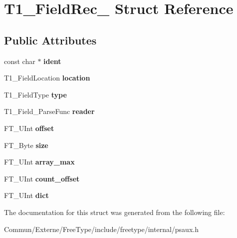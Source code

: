 \hypertarget{struct_t1___field_rec__}{}\section{T1\+\_\+\+Field\+Rec\+\_\+ Struct Reference}
\label{struct_t1___field_rec__}
\subsection*{Public Attributes}
\begin{DoxyCompactItemize}
\item 
const char $\ast$ {\bfseries ident}\hypertarget{struct_t1___field_rec___aaf70ae870eff9ea2b0518ef5e7301cfd}{}\label{struct_t1___field_rec___aaf70ae870eff9ea2b0518ef5e7301cfd}

\item 
T1\+\_\+\+Field\+Location {\bfseries location}\hypertarget{struct_t1___field_rec___a1e17111c68df523f82d20bddd822ca4d}{}\label{struct_t1___field_rec___a1e17111c68df523f82d20bddd822ca4d}

\item 
T1\+\_\+\+Field\+Type {\bfseries type}\hypertarget{struct_t1___field_rec___ad873155b36b72db9a1feaf2699fed1ce}{}\label{struct_t1___field_rec___ad873155b36b72db9a1feaf2699fed1ce}

\item 
T1\+\_\+\+Field\+\_\+\+Parse\+Func {\bfseries reader}\hypertarget{struct_t1___field_rec___a95e227de47c22bdadd77f797ff43d89d}{}\label{struct_t1___field_rec___a95e227de47c22bdadd77f797ff43d89d}

\item 
F\+T\+\_\+\+U\+Int {\bfseries offset}\hypertarget{struct_t1___field_rec___a41b503016f68291e061a2e29498982c1}{}\label{struct_t1___field_rec___a41b503016f68291e061a2e29498982c1}

\item 
F\+T\+\_\+\+Byte {\bfseries size}\hypertarget{struct_t1___field_rec___a8ce74a7ad2276abe8942883e7fbb1241}{}\label{struct_t1___field_rec___a8ce74a7ad2276abe8942883e7fbb1241}

\item 
F\+T\+\_\+\+U\+Int {\bfseries array\+\_\+max}\hypertarget{struct_t1___field_rec___a87f063bd3ad0dcfa30c00946d9f9cae8}{}\label{struct_t1___field_rec___a87f063bd3ad0dcfa30c00946d9f9cae8}

\item 
F\+T\+\_\+\+U\+Int {\bfseries count\+\_\+offset}\hypertarget{struct_t1___field_rec___a41d8814cc651d0276f8cfad751721326}{}\label{struct_t1___field_rec___a41d8814cc651d0276f8cfad751721326}

\item 
F\+T\+\_\+\+U\+Int {\bfseries dict}\hypertarget{struct_t1___field_rec___a509f7ddb1e0ffe050017daa29223e224}{}\label{struct_t1___field_rec___a509f7ddb1e0ffe050017daa29223e224}

\end{DoxyCompactItemize}


The documentation for this struct was generated from the following file\+:\begin{DoxyCompactItemize}
\item 
Commun/\+Externe/\+Free\+Type/include/freetype/internal/psaux.\+h\end{DoxyCompactItemize}
